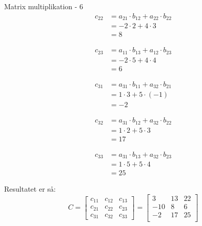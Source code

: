 \documentclass{article}
\begin{document}
\begin{exercise}{Matrix multiplikation - 6}
	\hint
	\begin{align*}
		c_{22} & = a_{21} \cdot b_{12} + a_{22} \cdot b_{22} \\
		& = -2 \cdot 2 + 4 \cdot 3 \\
		& = 8
	\end{align*}
	
	\hint
	\begin{align*}
		c_{23} & = a_{11} \cdot b_{13} + a_{12} \cdot b_{23} \\
		& = -2 \cdot 5 + 4 \cdot 4 \\
		& = 6
	\end{align*}
	
	\hint
	\begin{align*}
		c_{31} & = a_{31} \cdot b_{11} + a_{32} \cdot b_{21} \\
		& = 1 \cdot 3 + 5 \cdot (-1) \\
		& = -2
	\end{align*}	
	
	\hint
	\begin{align*}
		c_{32} & = a_{31} \cdot b_{12} + a_{32} \cdot b_{22} \\
		& = 1 \cdot 2 + 5 \cdot 3 \\
		& = 17
	\end{align*}
	
	\hint
	\begin{align*}
		c_{33} & = a_{31} \cdot b_{13} + a_{32} \cdot b_{23} \\
		& = 1 \cdot 5 + 5 \cdot 4 \\
		& = 25
	\end{align*}	
	
	
	
	\hint
	Resultatet er så:
	\[
	C = \left[\begin{array}{rrr}
	c_{11} & c_{12} & c_{13} \\
	c_{21} & c_{22} & c_{23} \\
	c_{31} & c_{32} & c_{33}
	\end{array} \right] = 
	\left[\begin{array}{rrr}
	3 & 13 & 22 \\
	-10 & 8 & 6 \\
	-2 & 17 & 25 \\
	\end{array} \right]
	\]
	
	
\end{exercise}

\newpage
\end{document}
